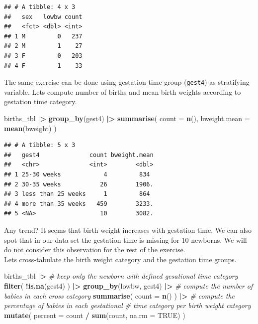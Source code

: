 \documentclass[
]{book}
\newenvironment{Shaded}{\begin{snugshade}}{\end{snugshade}}
\newcommand{\AttributeTok}[1]{\textcolor[rgb]{0.13,0.29,0.53}{#1}}
\newcommand{\CommentTok}[1]{\textcolor[rgb]{0.56,0.35,0.01}{\textit{#1}}}
\newcommand{\ConstantTok}[1]{\textcolor[rgb]{0.56,0.35,0.01}{#1}}
\newcommand{\FunctionTok}[1]{\textcolor[rgb]{0.13,0.29,0.53}{\textbf{#1}}}
\newcommand{\NormalTok}[1]{#1}
\newcommand{\SpecialCharTok}[1]{\textcolor[rgb]{0.81,0.36,0.00}{\textbf{#1}}}
\theoremstyle{definition}
\theoremstyle{definition}
\theoremstyle{definition}
\theoremstyle{definition}
\theoremstyle{remark}
\begin{document}
\begin{verbatim}
## # A tibble: 4 x 3
##   sex   lowbw count
##   <fct> <dbl> <int>
## 1 M         0   237
## 2 M         1    27
## 3 F         0   203
## 4 F         1    33
\end{verbatim}

The same exercise can be done using gestation time group (\texttt{gest4}) as stratifying variable.
Lets compute number of births and mean birth weights according to gestation time category.

\begin{Shaded}
\begin{Highlighting}[]
\NormalTok{births\_tbl }\SpecialCharTok{|\textgreater{}}
  \FunctionTok{group\_by}\NormalTok{(gest4) }\SpecialCharTok{|\textgreater{}}
  \FunctionTok{summarise}\NormalTok{(}
    \AttributeTok{count =} \FunctionTok{n}\NormalTok{(),}
    \AttributeTok{bweight.mean =} \FunctionTok{mean}\NormalTok{(bweight)}
\NormalTok{  )}
\end{Highlighting}
\end{Shaded}

\begin{verbatim}
## # A tibble: 5 x 3
##   gest4              count bweight.mean
##   <chr>              <int>        <dbl>
## 1 25-30 weeks            4         834 
## 2 30-35 weeks           26        1906.
## 3 less than 25 weeks     1         864 
## 4 more than 35 weeks   459        3233.
## 5 <NA>                  10        3082.
\end{verbatim}

Any trend?
It seems that birth weight increases with gestation time.
We can also spot that in our data-set the gestation time is missing for 10 newborns.
We will do not consider this observation for the rest of the exercise.\\
Lets cross-tabulate the birth weight category and the gestation time groups.

\begin{Shaded}
\begin{Highlighting}[]
\NormalTok{births\_tbl }\SpecialCharTok{|\textgreater{}}
  \CommentTok{\# keep only the newborn with defined gesational time category}
  \FunctionTok{filter}\NormalTok{(}
    \SpecialCharTok{!}\FunctionTok{is.na}\NormalTok{(gest4)}
\NormalTok{  ) }\SpecialCharTok{|\textgreater{}}
  \FunctionTok{group\_by}\NormalTok{(lowbw, gest4) }\SpecialCharTok{|\textgreater{}}
  \CommentTok{\# compute the number of babies in each cross category}
  \FunctionTok{summarise}\NormalTok{(}
    \AttributeTok{count =} \FunctionTok{n}\NormalTok{()}
\NormalTok{  ) }\SpecialCharTok{|\textgreater{}}
  \CommentTok{\# compute the percentage of babies in each gestational }
  \CommentTok{\# time category per birth weight category}
  \FunctionTok{mutate}\NormalTok{(}
    \AttributeTok{percent =}\NormalTok{ count }\SpecialCharTok{/} \FunctionTok{sum}\NormalTok{(count, }\AttributeTok{na.rm =} \ConstantTok{TRUE}\NormalTok{)}
\NormalTok{  )}
\end{Highlighting}
\end{Shaded}
\end{document}
